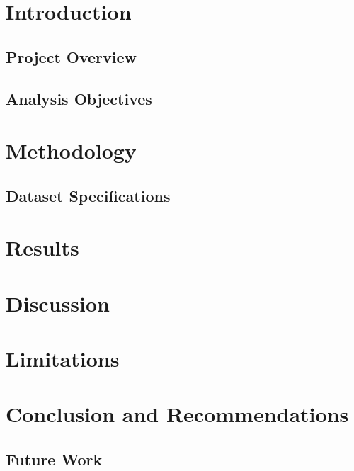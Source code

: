 \documentclass[a4paper,12pt]{article}
\begin{document}
\section{Introduction}

\subsection{Project Overview}

\subsection{Analysis Objectives}


\section{Methodology}

\subsection{Dataset Specifications}


\section{Results}


\section{Discussion}


\section{Limitations}


\section{Conclusion and Recommendations}

\subsection{Future Work}

\end{document}
